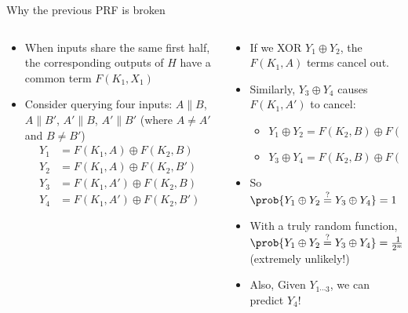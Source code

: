 \documentclass[aspectratio=169, lualatex, handout]{beamer}
\begin{document}
\begin{frame}{Why the previous PRF is broken}
	\begin{columns}[c]
		\begin{column}{0.5\textwidth}
			\begin{itemize}
				\item When inputs share the same first half, the corresponding outputs of $H$ have a common term $F(K_1, X_1)$
				\item Consider querying four inputs: $A\|B$, $A\|B'$, $A'\|B$, $A'\|B'$ (where $A \neq A'$ and $B \neq B'$)
				      \begin{align*}
					      Y_1 & = F(K_1, A) \oplus F(K_2, B)   \\
					      Y_2 & = F(K_1, A) \oplus F(K_2, B')  \\
					      Y_3 & = F(K_1, A') \oplus F(K_2, B)  \\
					      Y_4 & = F(K_1, A') \oplus F(K_2, B')
				      \end{align*}
			\end{itemize}
		\end{column}
		\begin{column}{0.5\textwidth}
			\begin{itemize}
				\item If we XOR $Y_1 \oplus Y_2$, the $F(K_1, A)$ terms cancel out.
				\item Similarly, $Y_3 \oplus Y_4$ causes $F(K_1, A')$ to cancel:
				      \begin{itemize}
					      \item $Y_1 \oplus Y_2 = F(K_2, B) \oplus F(K_2, B')$
					      \item $Y_3 \oplus Y_4 = F(K_2, B) \oplus F(K_2, B')$
				      \end{itemize}
				\item So $\prob{Y_1 \oplus Y_2 \stackrel{?}{=} Y_3 \oplus Y_4} = 1$
				\item With a truly random function, $\prob{Y_1 \oplus Y_2 \stackrel{?}{=} Y_3 \oplus Y_4} = \frac{1}{2^m}$ (extremely unlikely!)
				\item Also, Given $Y_{1\cdots3}$, we can predict $Y_4$!
			\end{itemize}
		\end{column}
	\end{columns}
\end{frame}
\end{document}
